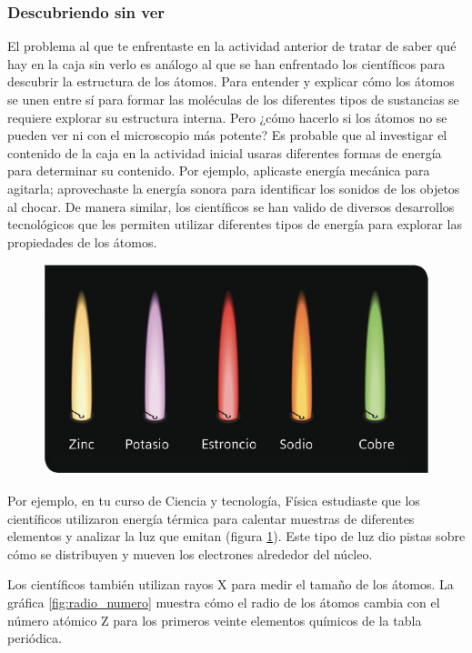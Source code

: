 \documentclass[11pt]{book}
\begin{document}
\subsubsection{Descubriendo sin ver}

El problema al que te enfrentaste en la actividad anterior de tratar de saber qué hay en la caja sin verlo
es análogo al que se han enfrentado los científicos para descubrir la estructura de los átomos.
Para entender y explicar cómo los átomos se unen entre sí para formar las moléculas de los diferentes
tipos de sustancias se requiere explorar su estructura interna. Pero ¿cómo hacerlo si los átomos no se
pueden ver ni con el microscopio más potente? Es probable que al investigar el contenido de la caja en
la actividad inicial usaras diferentes formas de energía para determinar su contenido.
Por ejemplo, aplicaste energía mecánica para agitarla; aprovechaste la energía sonora para identificar
los sonidos de los objetos al chocar. De manera similar, los científicos se han valido de diversos desarrollos
tecnológicos que les permiten utilizar diferentes tipos de energía para explorar las propiedades de los átomos.

\begin{figure}[H]
  \centering
  \includegraphics[width=0.5\linewidth]{flama.jpg}
  \label{fig:flama}
\end{figure}%

Por ejemplo, en tu curso de Ciencia y tecnología, Física estudiaste que los científicos utilizaron energía
térmica para calentar muestras de diferentes elementos y analizar la luz que emitan (figura \ref{fig:flama}).
Este tipo de luz dio pistas sobre cómo se distribuyen y mueven los electrones alrededor del núcleo.



Los científicos también utilizan rayos X para medir el tamaño de los átomos.
La gráfica \ref{fig:radio_numero} muestra cómo el radio de los átomos cambia con el número atómico Z para los
primeros veinte elementos químicos de la tabla periódica.
\end{document}
